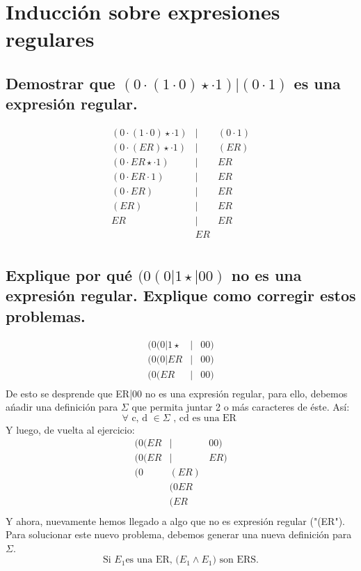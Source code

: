 \section{Inducción sobre expresiones regulares}
\subsection{Demostrar que $(0\cdot(1\cdot0)\star\cdot1)|(0\cdot1)$ es una expresión regular.}
\begin{eqnarray*}
	(0\cdot(1\cdot0)\star\cdot1)&|&(0\cdot1)\\
	(0\cdot (ER)\star\cdot1)&|&(ER)\\
	(0\cdot ER\star\cdot1)&|& ER\\
	(0\cdot ER\cdot1)&|& ER\\
	(0\cdot ER)&|& ER\\
	(ER)&|& ER\\
	ER &|& ER\\
   	&ER&\\
\end{eqnarray*}

\subsection{Explique por qué $(0(0|1\star|00)$ no es una expresión regular. Explique como corregir estos problemas.}
 \begin{eqnarray*}
 	(0( 0| 1\star &|& 00)\\
 	(0( 0|ER &|& 00)\\
 	(0( ER &|& 00)\\
 \end{eqnarray*}
	De esto se desprende que ER|00 no es una expresión regular, para ello, debemos ańadir una definición para $\Sigma$ que permita juntar 2 o más caracteres de éste. Así:
 \begin{equation}
 	\forall \text{ c, d } \in \Sigma \text{ , cd es una ER }
 \end{equation} \label{EQ:CD}
	Y luego, de vuelta al ejercicio:
 \begin{eqnarray*}
 	(0(ER&|&00)\\
 	(0(ER&|&ER)\\
 	(0&(ER)&\\
 	&(0ER&\\
 	&(ER&\\
 \end{eqnarray*}
 	Y ahora, nuevamente hemos llegado a algo que no es expresión regular ("(ER"). Para solucionar este nuevo problema, debemos generar una nueva definición para $\Sigma$.
 \begin{equation}
 	\text{Si } E_1 \text{es una ER, (}E_1 \wedge E_1\text{)} \text{ son ERS.}
 \end{equation}\label{EQ:PARENTESIS_INDIVIDUALES}
 
